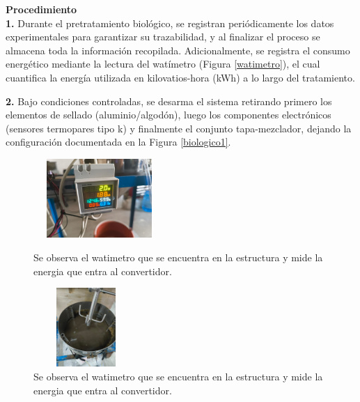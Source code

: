 \documentclass[12pt]{article}
\begin{document}
			
			\textbf{Procedimiento}
			\\[0.5em] 
			\textbf{1.} Durante el pretratamiento biológico, se registran periódicamente los datos experimentales para garantizar su trazabilidad, y al finalizar el proceso se almacena toda la información recopilada. Adicionalmente, se registra el consumo energético mediante la lectura del watímetro (Figura \ref{watimetro}), el cual cuantifica la energía utilizada en kilovatios-hora (kWh) a lo largo del tratamiento.
			
			
			\textbf{2.} Bajo condiciones controladas, se desarma el sistema retirando primero los elementos de sellado (aluminio/algodón), luego los componentes electrónicos (sensores termopares tipo k) y finalmente el conjunto tapa-mezclador, dejando la configuración documentada en la Figura \ref{biologico1}.
	
			
					
			\begin{figure}[H]
				\centering
				\begin{minipage}{0.46\textwidth}
					\centering
					\includegraphics[width=5cm, height=3cm]{imagenes/watimetro} %
					\caption{Se observa el watimetro que se encuentra en la estructura y mide la energia que entra al convertidor.}
						\label{watimetro}
					\end{minipage}
					\hfill
					\begin{minipage}{0.48\textwidth}
						\centering
						\includegraphics[width=4cm, height=3cm]{imagenes/biologico1} %
						\caption{Se observa el watimetro que se encuentra en la estructura y mide la energia que entra al convertidor.}
						\label{biologico1r}
					\end{minipage}
				\end{figure}
				
\end{document}
